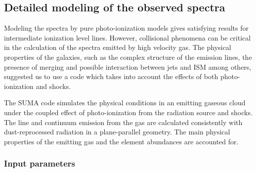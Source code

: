 \documentclass[../main.tex]{subfiles}
\begin{document}
\subsection{Detailed modeling of the observed spectra}
\label{sec:models}





Modeling the spectra by pure photo-ionization models gives satisfying results for intermediate ionization level lines.
However, collisional phenomena can be critical in the calculation of the spectra emitted by high velocity gas.
The physical properties of the galaxies, such as the complex structure of the emission lines, the presence of merging and possible interaction between jets and ISM among others, suggested us to use a code which takes into account the effects of both photo-ionization and shocks.

The SUMA code \citep[][and references therein]{Contini15} simulates the physical conditions in an emitting gaseous cloud under the coupled effect of photo-ionization from the radiation source and shocks. The line and continuum emission from the gas are calculated consistently with dust-reprocessed radiation in a plane-parallel geometry.
The main physical properties of the emitting gas and the element abundances are accounted for.

\subsubsection{Input parameters}
\end{document}
